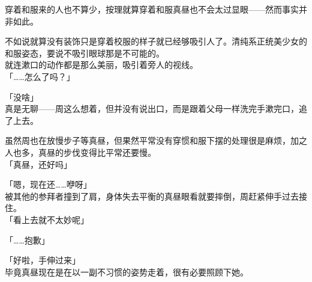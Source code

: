 穿着和服来的人也不算少，按理就算穿着和服真昼也不会太过显眼——然而事实并非如此。

不如说就算没有装饰只是穿着校服的样子就已经够吸引人了。清纯系正统美少女的和服姿态，要说不吸引眼球那是不可能的。\\

就连漱口的动作都是那么美丽，吸引着旁人的视线。\\

「……怎么了吗？」

「没啥」\\

真是无聊——周这么想着，但并没有说出口，而是跟着父母一样洗完手漱完口，追了上去。

虽然周也在放慢步子等真昼，但果然平常没有穿惯和服下摆的处理很是麻烦，加之人也多，真昼的步伐变得比平常还要慢。\\

「真昼，还好吗」

「嗯，现在还……咿呀」\\

被其他的参拜者撞到了肩，身体失去平衡的真昼眼看就要摔倒，周赶紧伸手过去接住。\\

「看上去就不太妙呢」

「……抱歉」

「好啦，手伸过来」\\

毕竟真昼现在是在以一副不习惯的姿势走着，很有必要照顾下她。

